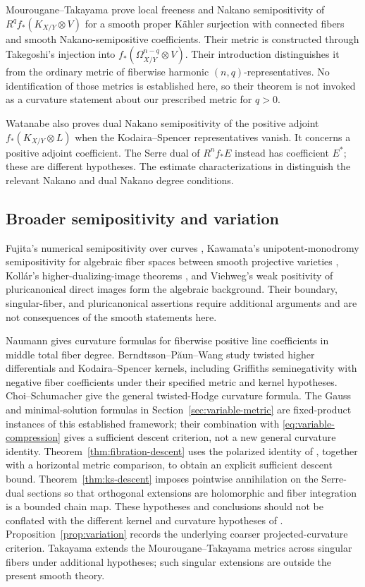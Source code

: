 \documentclass[11pt,reqno]{amsart}
\numberwithin{equation}{section}
\theoremstyle{definition}
\theoremstyle{remark}
\begin{document}
Mourougane--Takayama \cite[Theorem 1.1]{MT08} prove local freeness and Nakano semipositivity of $R^qf_*(K_{X/Y}\otimes V)$ for a smooth proper K\"ahler surjection with connected fibers and smooth Nakano-semipositive coefficients. Their metric is constructed through Takegoshi's injection into $f_*(\Omega^{n-q}_{X/Y}\otimes V)$. Their introduction distinguishes it from the ordinary metric of fiberwise harmonic $(n,q)$-representatives. No identification of those metrics is established here, so their theorem is not invoked as a curvature statement about our prescribed metric for $q>0$.

Watanabe \cite[Theorem 1.1]{Wat25} also proves dual Nakano semipositivity of the positive adjoint $f_*(K_{X/Y}\otimes L)$ when the Kodaira--Spencer representatives vanish. It concerns a positive adjoint coefficient. The Serre dual of $R^nf_*E$ instead has coefficient $E^*$; these are different hypotheses. The estimate characterizations in \cite{DNWZ23,Wat21} distinguish the relevant Nakano and dual Nakano degree conditions.

\subsection{Broader semipositivity and variation}
Fujita's numerical semipositivity over curves \cite{Fuj78}, Kawamata's unipotent-monodromy semipositivity for algebraic fiber spaces between smooth projective varieties \cite{Kaw81}, Koll\'ar's higher-dualizing-image theorems \cite{Kol86a,Kol86b}, and Viehweg's weak positivity of pluricanonical direct images \cite{Vie83} form the algebraic background. Their boundary, singular-fiber, and pluricanonical assertions require additional arguments and are not consequences of the smooth statements here.

Naumann \cite{Nau21} gives curvature formulas for fiberwise positive line coefficients in middle total fiber degree. Berndtsson--P\u{a}un--Wang \cite{BPW22} study twisted higher differentials and Kodaira--Spencer kernels, including Griffiths seminegativity with negative fiber coefficients under their specified metric and kernel hypotheses. Choi--Schumacher \cite{CS24} give the general twisted-Hodge curvature formula. The Gauss and minimal-solution formulas in Section~\ref{sec:variable-metric} are fixed-product instances of this established framework; their combination with \eqref{eq:variable-compression} gives a sufficient descent criterion, not a new general curvature identity. Theorem~\ref{thm:fibration-descent} uses the polarized identity of \cite[formula (7.2)]{CS24}, together with a horizontal metric comparison, to obtain an explicit sufficient descent bound. Theorem~\ref{thm:ks-descent} imposes pointwise annihilation on the Serre-dual sections so that orthogonal extensions are holomorphic and fiber integration is a bounded chain map. These hypotheses and conclusions should not be conflated with the different kernel and curvature hypotheses of \cite{BPW22}. Proposition~\ref{prop:variation} records the underlying coarser projected-curvature criterion. Takayama \cite{Tak24} extends the Mourougane--Takayama metrics across singular fibers under additional hypotheses; such singular extensions are outside the present smooth theory.
\end{document}
